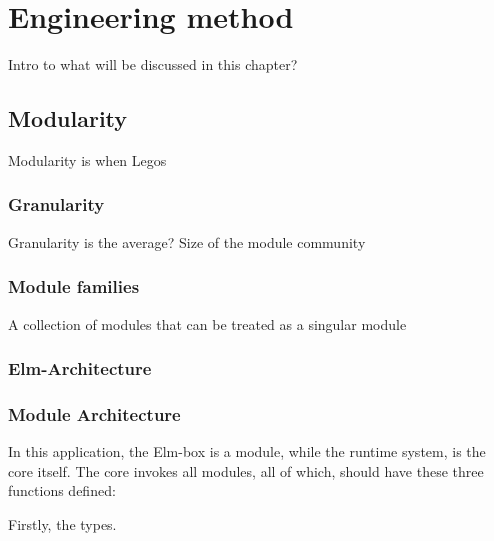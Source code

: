 \chapter{Engineering method}


Intro to what will be discussed in this chapter?

\section{Modularity}

Modularity is when Legos

\subsection{Granularity}

Granularity is the average? Size of the module community

\subsection{Module families}

A collection of modules that can be treated as a singular module

\subsection{Elm-Architecture}


\subsection{Module Architecture}

In this application, the Elm-box is a module, while the runtime system, is the
core itself. The core invokes all modules, all of which, should have these three
functions defined:


\begin{center}
  
\end{center}

Firstly, the types.

